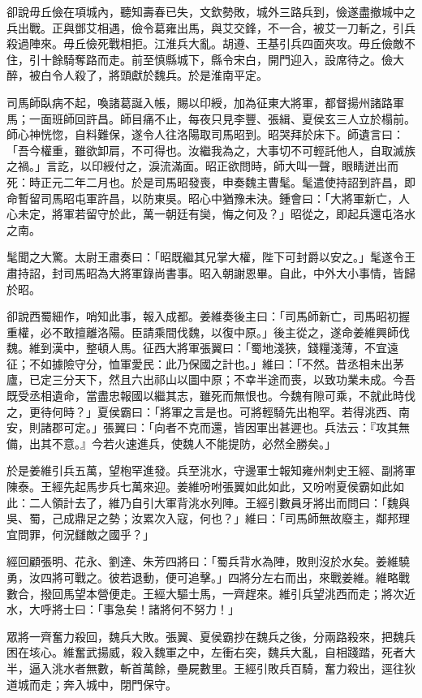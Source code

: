 卻說毋丘儉在項城內，聽知壽春已失，文欽勢敗，城外三路兵到，儉遂盡撤城中之兵出戰。正與鄧艾相遇，儉令葛雍出馬，與艾交鋒，不一合，被艾一刀斬之，引兵殺過陣來。毋丘儉死戰相拒。江淮兵大亂。胡遵、王基引兵四面夾攻。毋丘儉敵不住，引十餘騎奪路而走。前至慎縣城下，縣令宋白，開門迎入，設席待之。儉大醉，被白令人殺了，將頭獻於魏兵。於是淮南平定。

司馬師臥病不起，喚諸葛誕入帳，賜以印綬，加為征東大將軍，都督揚州諸路軍馬；一面班師回許昌。師目痛不止，每夜只見李豐、張緝、夏侯玄三人立於榻前。師心神恍惚，自料難保，遂令人往洛陽取司馬昭到。昭哭拜於床下。師遺言曰：「吾今權重，雖欲卸肩，不可得也。汝繼我為之，大事切不可輕託他人，自取滅族之禍。」言訖，以印綬付之，淚流滿面。昭正欲問時，師大叫一聲，眼睛迸出而死：時正元二年二月也。於是司馬昭發喪，申奏魏主曹髦。髦遣使持詔到許昌，即命暫留司馬昭屯軍許昌，以防東吳。昭心中猶豫未決。鍾會曰：「大將軍新亡，人心未定，將軍若留守於此，萬一朝廷有奱，悔之何及？」昭從之，即起兵還屯洛水之南。

髦聞之大驚。太尉王肅奏曰：「昭既繼其兄掌大權，陛下可封爵以安之。」髦遂令王肅持詔，封司馬昭為大將軍錄尚書事。昭入朝謝恩畢。自此，中外大小事情，皆歸於昭。

卻說西蜀細作，哨知此事，報入成都。姜維奏後主曰：「司馬師新亡，司馬昭初握重權，必不敢擅離洛陽。臣請乘間伐魏，以復中原。」後主從之，遂命姜維興師伐魏。維到漢中，整頓人馬。征西大將軍張翼曰：「蜀地淺狹，錢糧淺薄，不宜遠征；不如據險守分，恤軍愛民：此乃保國之計也。」維曰：「不然。昔丞相未出茅廬，已定三分天下，然且六出祁山以圖中原；不幸半途而喪，以致功業未成。今吾既受丞相遺命，當盡忠報國以繼其志，雖死而無恨也。今魏有隙可乘，不就此時伐之，更待何時？」夏侯霸曰：「將軍之言是也。可將輕騎先出枹罕。若得洮西、南安，則諸郡可定。」張翼曰：「向者不克而還，皆因軍出甚遲也。兵法云：『攻其無備，出其不意。』今若火速進兵，使魏人不能提防，必然全勝矣。」

於是姜維引兵五萬，望枹罕進發。兵至洮水，守邊軍士報知雍州刺史王經、副將軍陳泰。王經先起馬步兵七萬來迎。姜維吩咐張翼如此如此，又吩咐夏侯霸如此如此：二人領計去了，維乃自引大軍背洮水列陣。王經引數員牙將出而問曰：「魏與吳、蜀，己成鼎足之勢；汝累次入寇，何也？」維曰：「司馬師無故廢主，鄰邦理宜問罪，何況讎敵之國乎？」

經回顧張明、花永、劉達、朱芳四將曰：「蜀兵背水為陣，敗則沒於水矣。姜維驍勇，汝四將可戰之。彼若退動，便可追擊。」四將分左右而出，來戰姜維。維略戰數合，撥回馬望本營便走。王經大驅士馬，一齊趕來。維引兵望洮西而走；將次近水，大呼將士曰：「事急矣！諸將何不努力！」

眾將一齊奮力殺回，魏兵大敗。張翼、夏侯霸抄在魏兵之後，分兩路殺來，把魏兵困在垓心。維奮武揚威，殺入魏軍之中，左衝右突，魏兵大亂，自相踐踏，死者大半，逼入洮水者無數，斬首萬餘，壘屍數里。王經引敗兵百騎，奮力殺出，逕往狄道城而走；奔入城中，閉門保守。

